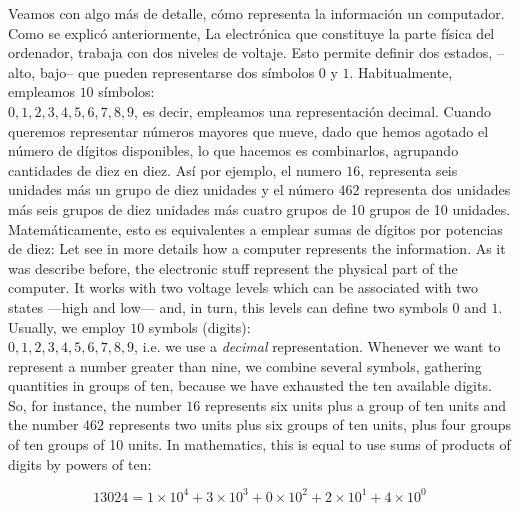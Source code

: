 \begin{paracol}{2}
Veamos con algo más de detalle, cómo representa la información un computador. Como se explicó anteriormente, La electrónica que constituye la parte física del ordenador, trabaja con dos niveles de voltaje. Esto permite definir dos estados, --alto, bajo-- que pueden representarse dos símbolos  $0$ y $1$. Habitualmente, empleamos $10$ símbolos: \\${0,1,2,3,4,5,6,7,8,9}$, es decir, empleamos una representación decimal. Cuando queremos representar números mayores que nueve, dado que hemos agotado el número de dígitos disponibles, lo que hacemos es combinarlos, agrupando cantidades de diez en diez. Así por ejemplo, el numero $16$, representa seis unidades más un grupo de diez unidades y el número $462$ representa dos unidades más seis grupos de diez unidades más cuatro grupos de 10 grupos de 10 unidades.  Matemáticamente, esto es equivalentes a emplear sumas de dígitos por potencias de diez:
\switchcolumn
Let see in more details how a computer represents the information. As it was describe before, the electronic stuff represent the physical part of the computer. It works with two voltage levels which can be associated with two states ---high and low--- and, in turn, this levels can define two symbols  $0$ and $1$. Usually, we employ $10$ symbols (digits):\\ ${0,1,2,3,4,5,6,7,8,9}$, i.e. we use a \emph{decimal} representation. Whenever we want to represent a number greater than nine, we combine several symbols, gathering quantities in groups of ten, because we have exhausted the ten available digits. So, for instance,  the number $16$ represents six units plus a group of ten units and the number $462$ represents two units plus six groups of ten units, plus four groups of ten groups of 10 units. In mathematics, this is equal to use sums of products of digits by powers of ten:       

\end{paracol}
\begin{equation*}
13024 = 1\times10^4+3\times10^3+0\times10^2+2\times10^1+4\times10^0 
\end{equation*}

